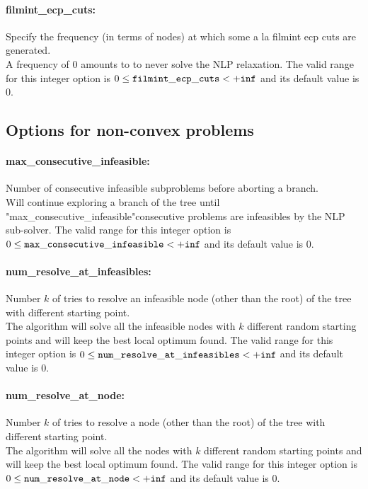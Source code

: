 \paragraph{filmint\_ecp\_cuts:} Specify the frequency (in terms of nodes) at which some a la filmint ecp cuts are generated. $\;$ \\
 A frequency of 0 amounts to to never solve the
NLP relaxation. The valid range for this integer option is
$0 \le {\tt filmint\_ecp\_cuts } <  {\tt +inf}$
and its default value is $0$.


\subsection{Options for non-convex problems}
\label{sec:Options_for_non-convex_problems}
\paragraph{max\_consecutive\_infeasible:} Number of consecutive infeasible subproblems before aborting a branch. $\;$ \\
 Will continue exploring a branch of the tree
until "max\_consecutive\_infeasible"consecutive
problems are infeasibles by the NLP sub-solver. The valid range for this integer option is
$0 \le {\tt max\_consecutive\_infeasible } <  {\tt +inf}$
and its default value is $0$.


\paragraph{num\_resolve\_at\_infeasibles:} Number $k$ of tries to resolve an infeasible node (other than the root) of the tree with different starting point. $\;$ \\
 The algorithm will solve all the infeasible nodes
with $k$ different random starting points and
will keep the best local optimum found. The valid range for this integer option is
$0 \le {\tt num\_resolve\_at\_infeasibles } <  {\tt +inf}$
and its default value is $0$.


\paragraph{num\_resolve\_at\_node:} Number $k$ of tries to resolve a node (other than the root) of the tree with different starting point. $\;$ \\
 The algorithm will solve all the nodes with $k$
different random starting points and will keep
the best local optimum found. The valid range for this integer option is
$0 \le {\tt num\_resolve\_at\_node } <  {\tt +inf}$
and its default value is $0$.


